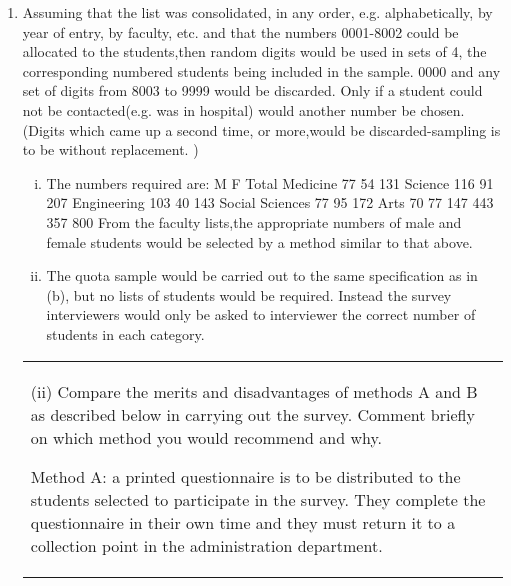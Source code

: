 \documentclass[a4paper,12pt]{article}
\begin{document}
\begin{enumerate}
    \item Assuming that the list was consolidated, in any order, e.g. alphabetically, by year
of entry, by faculty, etc. and that the numbers 0001-8002 could be allocated to the
students,then random digits would be used in sets of 4, the corresponding numbered
students being included in the sample. 0000 and any set of digits from 8003 to
9999 would be discarded. Only if a student could not be contacted(e.g. was in
hospital) would another number be chosen. (Digits which came up a second time,
or more,would be discarded-sampling is to be without replacement. )
\begin{enumerate}[(i)]
\item  The numbers required are:
M F Total
Medicine 77 54 131
Science 116 91 207
Engineering 103 40 143
Social Sciences 77 95 172
Arts 70 77 147
443 357 800
From the faculty lists,the appropriate numbers of male and female students would
be selected by a method similar to that above.
\item The quota sample would be carried out to the same specification as in (b), but no
lists of students would be required. Instead the survey interviewers would only be
asked to interviewer the correct number of students in each category.
\end{enumerate}

\newpage
\begin{table}[ht!]
 \centering
 \begin{tabular}{|p{15cm}|}
 \hline  
(ii) Compare the merits and disadvantages of methods A and B as described below in carrying out the survey.  Comment briefly on which method you would recommend and why. 
 
 Method A:  a printed questionnaire is to be distributed to the students selected to participate in the survey.  They complete the questionnaire in their own time and they must return it to a collection point in the administration department. 
 

\end{tabular}
\end{table}
\end{enumerate}
\end{document}
